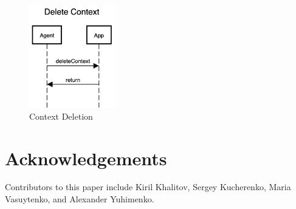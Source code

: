 \documentclass[11pt, oneside]{article}   	%
\begin{document}

\begin{figure}[htbp]
	\centering
	\includegraphics[width=0.33\textwidth]{./images/int-context_deletion.png}
	\caption{Context Deletion}
	\label{fig:context-deletion}
\end{figure}

\clearpage

\section{Acknowledgements}
Contributors to this paper include Kiril Khalitov, Sergey Kucherenko, Maria Vasuytenko, and Alexander Yuhimenko.



\end{document}
